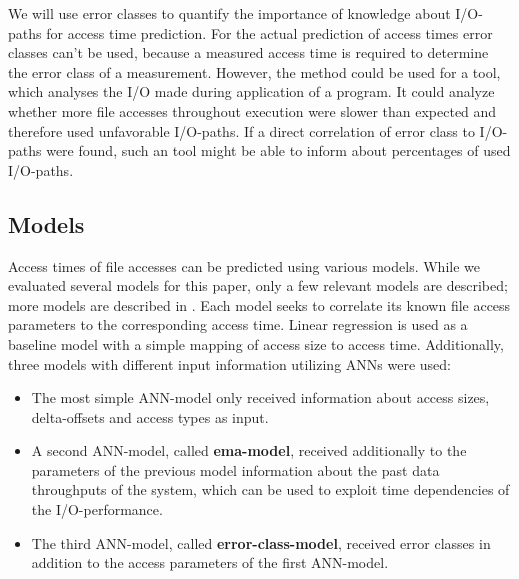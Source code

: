 \documentclass{superfri}
\begin{document}
We will use error classes to quantify the importance of knowledge about I/O-paths for access time prediction.
For the actual prediction of access times error classes can't be used, because a measured access time is required to determine the error class of a measurement.
However, the method could be used for a tool, which analyses the I/O made during application of a program. 
It could analyze whether more file accesses throughout execution were slower than expected and therefore used unfavorable I/O-paths.
If a direct correlation of error class to I/O-paths were found, such an tool might be able to inform about percentages of used I/O-paths.

\subsection{Models}
Access times of file accesses can be predicted using various models.
While we evaluated several models for this paper, only a few relevant models are described; more models are described in \cite{VVEIHUDVVN15}. 
Each model seeks to correlate its known file access parameters to the corresponding access time. 
Linear regression is used as a baseline model with a simple mapping of access size to access time.
Additionally, three models with different input information utilizing ANNs were used:
\begin{itemize}
	\item The most simple ANN-model only received information about access sizes, delta-offsets and access types as input.
	\item A second ANN-model, called \textbf{ema-model}, received additionally to the parameters of the previous model information about the past data throughputs of the system, which can be used to exploit time dependencies of the I/O-performance.
	\item The third ANN-model, called \textbf{error-class-model}, received error classes in addition to the access parameters of the first ANN-model.
\end{itemize}\medskip
\end{document}
